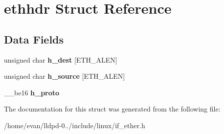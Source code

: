 \section{ethhdr \-Struct \-Reference}
\label{structethhdr}
\subsection*{\-Data \-Fields}
\begin{DoxyCompactItemize}
\item 
unsigned char {\bfseries h\-\_\-dest} [\-E\-T\-H\-\_\-\-A\-L\-E\-N]\label{structethhdr_a4ed9730824f0fec5b744ab5c58090101}

\item 
unsigned char {\bfseries h\-\_\-source} [\-E\-T\-H\-\_\-\-A\-L\-E\-N]\label{structethhdr_a97dd3055fe7dd35d5e54aced21ed67d3}

\item 
\-\_\-\-\_\-be16 {\bfseries h\-\_\-proto}\label{structethhdr_a5d2bbedddf19ed1808cb7ba336defcc7}

\end{DoxyCompactItemize}


\-The documentation for this struct was generated from the following file\-:\begin{DoxyCompactItemize}
\item 
/home/evan/lldpd-\/0../include/linux/if\-\_\-ether.\-h\end{DoxyCompactItemize}
